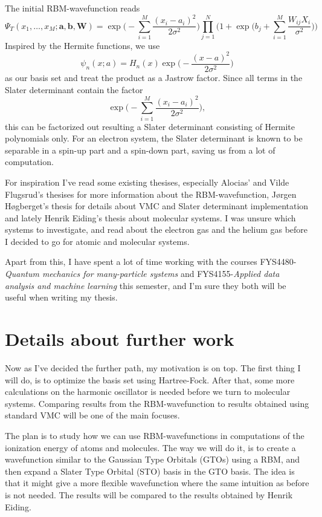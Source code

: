 \documentclass[10pt]{article}
\begin{document}
The initial RBM-wavefunction reads
\begin{equation}
\Psi_T(x_1,\hdots,x_M; \boldsymbol{a}, \boldsymbol{b}, \boldsymbol{W}) = \exp\bigg(-\sum_{i=1}^M\frac{(x_i-a_i)^2}{2\sigma^2}\bigg)\prod_{j=1}^N\bigg(1+\exp\Big(b_j+\sum_{i=1}^M\frac{W_{ij}X_i}{\sigma^2}\Big)\bigg)
\end{equation}
Inspired by the Hermite functions, we use
\begin{equation}
\psi_n(x;a)=H_n(x)\exp\bigg(-\frac{(x-a)^2}{2\sigma^2}\bigg)
\end{equation}
as our basis set and treat the product as a Jastrow factor. Since all terms in the Slater determinant contain the factor
\begin{equation}
\exp\bigg(-\sum_{i=1}^M\frac{(x_i-a_i)^2}{2\sigma^2}\bigg),
\end{equation}
this can be factorized out resulting a Slater determinant consisting of Hermite polynomials only. For an electron system, the Slater determinant is known to be separable in a spin-up part and a spin-down part, saving us from a lot of computation. 

For inspiration I've read some existing thesises, especially Alocias' and Vilde Flugsrud's thesises for more information about the RBM-wavefunction, Jørgen Høgberget's thesis for details about VMC and Slater determinant implementation and lately Henrik Eiding's thesis about molecular systems. I was unsure which systems to investigate, and read about the electron gas and the helium gas before I decided to go for atomic and molecular systems. 

Apart from this, I have spent a lot of time working with the courses FYS4480-\textit{Quantum mechanics for many-particle systems} and FYS4155-\textit{Applied data analysis and machine learning} this semester, and I'm sure they both will be useful when writing my thesis.

\section*{Details about further work}
Now as I've decided the further path, my motivation is on top. The first thing I will do, is to optimize the basis set using Hartree-Fock. After that, some more calculations on the harmonic oscillator is needed before we turn to molecular systems. Comparing results from the RBM-wavefunction to results obtained using standard VMC will be one of the main focuses. 

The plan is to study how we can use RBM-wavefunctions in computations of the ionization energy of atoms and molecules. The way we will do it, is to create a wavefunction similar to the Gaussian Type Orbitals (GTOs) using a RBM, and then expand a Slater Type Orbital (STO) basis in the GTO basis. The idea is that it might give a more flexible wavefunction where the same intuition as before is not needed. The results will be compared to the results obtained by Henrik Eiding.
\end{document}
